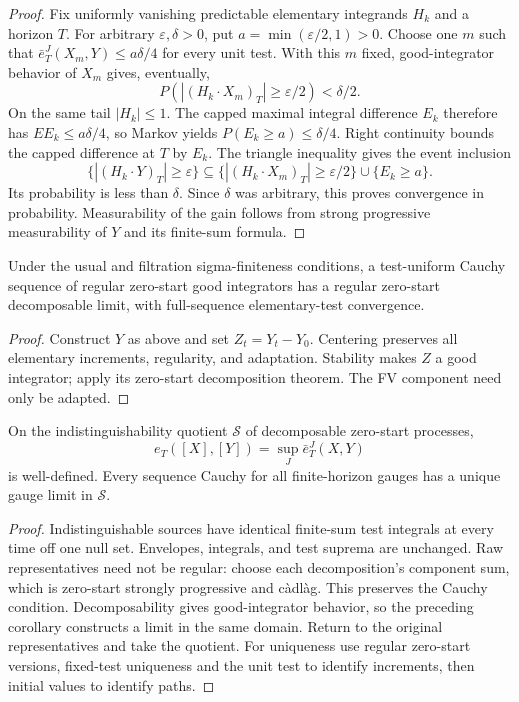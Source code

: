 \begin{proof}
Fix uniformly vanishing predictable elementary integrands $H_k$ and a
horizon $T$. For arbitrary $\varepsilon,\delta>0$, put
$a=\min(\varepsilon/2,1)>0$.
Choose one $m$ such that $\bar e_T^J(X_m,Y)\leq a\delta/4$ for every unit test.
With this $m$ fixed, good-integrator behavior of $X_m$ gives, eventually,
\[
 P(|(H_k\cdot X_m)_T|\geq\varepsilon/2)<\delta/2.
\]
On the same tail $|H_k|\leq1$. The capped maximal integral difference
$E_k$ therefore has $EE_k\leq a\delta/4$, so Markov yields
$P(E_k\geq a)\leq\delta/4$.
Right continuity bounds the capped difference at $T$ by $E_k$.
The triangle inequality gives the event inclusion
\[
 \{|(H_k\cdot Y)_T|\geq\varepsilon\}
 \subseteq\{|(H_k\cdot X_m)_T|\geq\varepsilon/2\}\cup\{E_k\geq a\}.
\]
Its probability is less than $\delta$. Since $\delta$ was arbitrary,
this proves convergence in probability. Measurability of the gain follows
from strong progressive measurability of $Y$ and its finite-sum formula.
\end{proof}
\begin{corollary}
Under the usual and filtration sigma-finiteness conditions, a test-uniform
Cauchy sequence of regular zero-start good integrators has a regular
zero-start decomposable limit, with full-sequence elementary-test convergence.
\end{corollary}
\begin{proof}
Construct $Y$ as above and set $Z_t=Y_t-Y_0$.
Centering preserves all elementary increments, regularity, and adaptation.
Stability makes $Z$ a good integrator; apply its zero-start decomposition
theorem. The FV component need only be adapted.
\end{proof}
\begin{proposition}
On the indistinguishability quotient $\mathcal S$ of decomposable zero-start
processes,
\[
 e_T([X],[Y])=\sup_J\bar e_T^J(X,Y)
\]
 is well-defined.
Every sequence Cauchy for all finite-horizon gauges has a unique gauge limit
in $\mathcal S$.
\end{proposition}
\begin{proof}
Indistinguishable sources have identical finite-sum test integrals at every
time off one null set. Envelopes, integrals, and test suprema are unchanged.
Raw representatives need not be regular: choose each decomposition's component
sum, which is zero-start strongly progressive and c\`adl\`ag.
This preserves the Cauchy condition. Decomposability gives good-integrator
behavior, so the preceding corollary constructs a limit in the same domain.
Return to the original representatives and take the quotient.
For uniqueness use regular zero-start versions, fixed-test uniqueness and
the unit test to identify increments, then initial values to identify paths.
\end{proof}
